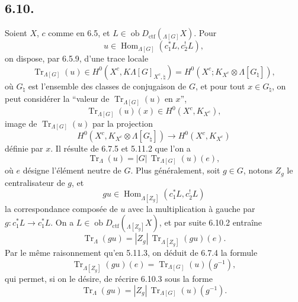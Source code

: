 \documentclass[11pt]{article}
\DeclareMathOperator{\Hom}{Hom}
\providecommand{\Tr}{\operatorname{Tr}}
\providecommand{\Tr}{\operatorname{Tr}}
\providecommand{\Ob}{\operatorname{ob}}
\providecommand{\Tr}{\operatorname{Tr}}
\providecommand{\Hom}{\operatorname{Hom}}
\providecommand{\Ob}{\operatorname{ob}}
\providecommand{\Tr}{\operatorname{Tr}}
\providecommand{\Ob}{\operatorname{Ob}}
\providecommand{\Hom}{\operatorname{Hom}}
\providecommand{\Tr}{\operatorname{Tr}}
\providecommand{\Ob}{\operatorname{ob}}
\providecommand{\Ob}{\operatorname{Ob}}
\begin{document}
\subsection*{6.10.}
Soient $X$, $c$ comme en 6.5, et $L\in\Ob D_{\mathrm{ctf}}({}_{\Lambda[G]}X)$. Pour
\[
u\in\Hom_{\Lambda[G]}(c_1^*L,c_2^!L),
\]
on dispose, par 6.5.9, d'une trace locale
\begin{equation}
\Tr_{\Lambda[G]}(u)\in
H^0(X^c,K\Lambda[G]_{X^c,\natural})
=H^0(X^c;K_{X^c}\otimes\Lambda[G_{\natural}]),
\tag{6.10.1}
\end{equation}
où $G_{\natural}$ est l'ensemble des classes de conjugaison de $G$, et pour tout $x\in G_{\natural}$, on peut considérer la ``valeur de $\Tr_{\Lambda[G]}(u)$ en $x$'',
\[
\Tr_{\Lambda[G]}(u)(x)\in H^0(X^c,K_{X^c}),
\]
image de $\Tr_{\Lambda[G]}(u)$ par la projection
\[
H^0(X^c,K_{X^c}\otimes\Lambda[G_{\natural}])
\longrightarrow H^0(X^c,K_{X^c})
\]
définie par $x$. Il résulte de 6.7.5 et 5.11.2 que l'on a
\begin{equation}
\Tr_{\Lambda}(u)=|G|\,\Tr_{\Lambda[G]}(u)(e),
\tag{6.10.2}
\end{equation}
où $e$ désigne l'élément neutre de $G$. Plus généralement, soit $g\in G$, notons $Z_g$ le centralisateur de $g$, et
\[
gu\in\Hom_{\Lambda[Z_g]}(c_1^*L,c_2^!L)
\]
la correspondance composée de $u$ avec la multiplication à gauche par $g:c_1^*L\to c_1^*L$. On a $L\in\Ob D_{\mathrm{ctf}}({}_{\Lambda[Z_g]}X)$, et par suite 6.10.2 entraîne
\begin{equation}
\Tr_{\Lambda}(gu)=|Z_g|\,\Tr_{\Lambda[Z_g]}(gu)(e).
\tag{6.10.3}
\end{equation}
Par le même raisonnement qu'en 5.11.3, on déduit de 6.7.4 la formule
\begin{equation}
\Tr_{\Lambda[Z_g]}(gu)(e)=\Tr_{\Lambda[G]}(u)(g^{-1}),
\tag{6.10.4}
\end{equation}
qui permet, si on le désire, de récrire 6.10.3 sous la forme
\begin{equation}
\Tr_{\Lambda}(gu)=|Z_g|\,\Tr_{\Lambda[G]}(u)(g^{-1}).
\tag{6.10.5}
\end{equation}
\end{document}
